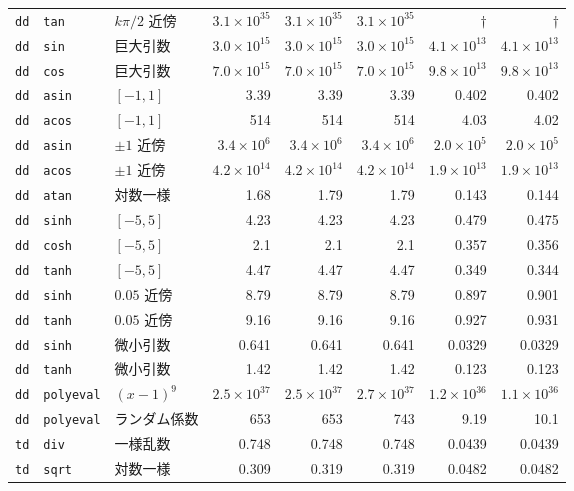 \documentclass[a4paper,10pt]{ltjsarticle}
\begin{document}
\begin{longtable}{lll rrr rr}
\texttt{dd} & \texttt{tan} & $k\pi/2$ 近傍 & $3.1\times10^{35}$ & $3.1\times10^{35}$ & $3.1\times10^{35}$ & $\dagger$ & $\dagger$ \\
\texttt{dd} & \texttt{sin} & 巨大引数 & $3.0\times10^{15}$ & $3.0\times10^{15}$ & $3.0\times10^{15}$ & $4.1\times10^{13}$ & $4.1\times10^{13}$ \\
\texttt{dd} & \texttt{cos} & 巨大引数 & $7.0\times10^{15}$ & $7.0\times10^{15}$ & $7.0\times10^{15}$ & $9.8\times10^{13}$ & $9.8\times10^{13}$ \\
\texttt{dd} & \texttt{asin} & $[-1,1]$ & 3.39 & 3.39 & 3.39 & 0.402 & 0.402 \\
\texttt{dd} & \texttt{acos} & $[-1,1]$ & 514 & 514 & 514 & 4.03 & 4.02 \\
\texttt{dd} & \texttt{asin} & $\pm1$ 近傍 & $3.4\times10^{6}$ & $3.4\times10^{6}$ & $3.4\times10^{6}$ & $2.0\times10^{5}$ & $2.0\times10^{5}$ \\
\texttt{dd} & \texttt{acos} & $\pm1$ 近傍 & $4.2\times10^{14}$ & $4.2\times10^{14}$ & $4.2\times10^{14}$ & $1.9\times10^{13}$ & $1.9\times10^{13}$ \\
\texttt{dd} & \texttt{atan} & 対数一様 & 1.68 & 1.79 & 1.79 & 0.143 & 0.144 \\
\texttt{dd} & \texttt{sinh} & $[-5,5]$ & 4.23 & 4.23 & 4.23 & 0.479 & 0.475 \\
\texttt{dd} & \texttt{cosh} & $[-5,5]$ & 2.1 & 2.1 & 2.1 & 0.357 & 0.356 \\
\texttt{dd} & \texttt{tanh} & $[-5,5]$ & 4.47 & 4.47 & 4.47 & 0.349 & 0.344 \\
\texttt{dd} & \texttt{sinh} & $0.05$ 近傍 & 8.79 & 8.79 & 8.79 & 0.897 & 0.901 \\
\texttt{dd} & \texttt{tanh} & $0.05$ 近傍 & 9.16 & 9.16 & 9.16 & 0.927 & 0.931 \\
\texttt{dd} & \texttt{sinh} & 微小引数 & 0.641 & 0.641 & 0.641 & 0.0329 & 0.0329 \\
\texttt{dd} & \texttt{tanh} & 微小引数 & 1.42 & 1.42 & 1.42 & 0.123 & 0.123 \\
\texttt{dd} & \texttt{polyeval} & $(x-1)^9$ & $2.5\times10^{37}$ & $2.5\times10^{37}$ & $2.7\times10^{37}$ & $1.2\times10^{36}$ & $1.1\times10^{36}$ \\
\texttt{dd} & \texttt{polyeval} & ランダム係数 & 653 & 653 & 743 & 9.19 & 10.1 \\
\texttt{td} & \texttt{div} & 一様乱数 & 0.748 & 0.748 & 0.748 & 0.0439 & 0.0439 \\
\texttt{td} & \texttt{sqrt} & 対数一様 & 0.309 & 0.319 & 0.319 & 0.0482 & 0.0482 \\

\end{longtable}
\end{document}
